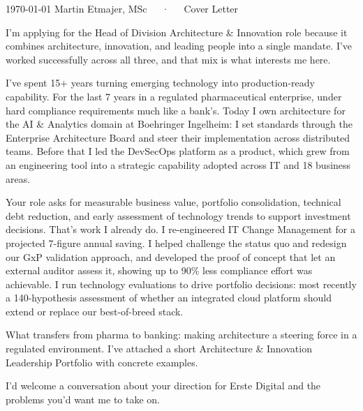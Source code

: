 \documentclass[11pt, a4paper]{awesome-cv}
\begin{document}
\makecvheader[C]

\makecvfooter
  {\today}
  {Martin Etmajer, MSc~~~·~~~Cover Letter}
  {}

\makelettertitle

\begin{cvletter}

I'm applying for the Head of Division Architecture \& Innovation role because it combines architecture, innovation, and leading people into a single mandate. I've worked successfully across all three, and that mix is what interests me here.

I've spent 15+ years turning emerging technology into production-ready capability. For the last 7 years in a regulated pharmaceutical enterprise, under hard compliance requirements much like a bank's. Today I own architecture for the AI \& Analytics domain at Boehringer Ingelheim: I set standards through the Enterprise Architecture Board and steer their implementation across distributed teams. Before that I led the DevSecOps platform as a product, which grew from an engineering tool into a strategic capability adopted across IT and 18 business areas.

Your role asks for measurable business value, portfolio consolidation, technical debt reduction, and early assessment of technology trends to support investment decisions. That's work I already do. I re-engineered IT Change Management for a projected 7-figure annual saving. I helped challenge the status quo and redesign our GxP validation approach, and developed the proof of concept that let an external auditor assess it, showing up to 90\% less compliance effort was achievable. I run technology evaluations to drive portfolio decisions: most recently a 140-hypothesis assessment of whether an integrated cloud platform should extend or replace our best-of-breed stack.

What transfers from pharma to banking: making architecture a steering force in a regulated environment. I've attached a short Architecture \& Innovation Leadership Portfolio with concrete examples.

I'd welcome a conversation about your direction for Erste Digital and the problems you'd want me to take on.

\end{cvletter}

\makeletterclosing
\end{document}
